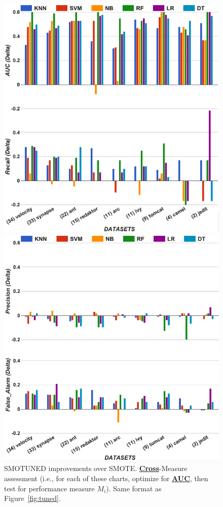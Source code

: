 \documentclass[sigconf]{acmart}
\theoremstyle{break}
\begin{document}
\begin{figure}[!t]
\begin{minipage}{.5\linewidth}
\centering
        \includegraphics[width=.75\linewidth,keepaspectratio,trim=1cm 1cm 1cm 0cm]{./fig/AUC_auc1.png}
    \end{minipage}%
\begin{minipage}{.5\linewidth}
        \centering
        \includegraphics[width=.75\linewidth,keepaspectratio,trim=1cm 1cm 1cm 0cm]{./fig/AUC_prec.png}
    \end{minipage}%
    
    \caption{ SMOTUNED improvements over SMOTE. 
    \underline{{\bf Cross}}-Measure
    assessment (i.e., for each of these charts,
    optimize for \underline{{\bf AUC}}, then test for
    performance measure $M_i$).  Same format as
    Figure~\ref{fig:tuned}.}
    \label{fig:auc22}
    \vspace{-0.3cm}
\end{figure}
\end{document}
